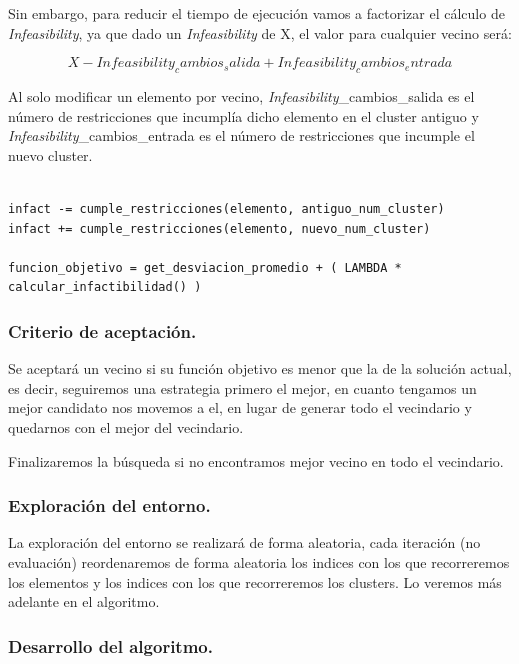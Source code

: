 \documentclass[12pt, spanish]{article}
\begin{document}
Sin embargo, para reducir el tiempo de ejecución vamos a factorizar el cálculo de \textit{Infeasibility}, ya que dado un \textit{Infeasibility} de X, el valor para cualquier vecino será:

$$X - \textit{Infeasibility}_cambios_salida + \textit{Infeasibility}_cambios_entrada$$
 
 Al solo modificar un elemento por vecino, \textit{Infeasibility}\_cambios\_salida  es el número de restricciones que incumplía dicho elemento en el cluster antiguo y \textit{Infeasibility}\_cambios\_entrada es el número de restricciones que incumple el nuevo cluster.
 
 
 
\begin{lstlisting}

infact -= cumple_restricciones(elemento, antiguo_num_cluster)
infact += cumple_restricciones(elemento, nuevo_num_cluster)

funcion_objetivo = get_desviacion_promedio + ( LAMBDA * calcular_infactibilidad() )

 \end{lstlisting}

\subsubsection{Criterio de aceptación.}

Se aceptará un vecino si su función objetivo es menor que la de la solución actual, es decir, seguiremos una estrategia primero el mejor, en cuanto tengamos un mejor candidato nos movemos a el, en lugar de generar todo el vecindario y quedarnos con el mejor del vecindario.

Finalizaremos la búsqueda si no encontramos mejor vecino en todo el vecindario.

\subsubsection{Exploración del entorno.}

La exploración del entorno se realizará de forma aleatoria, cada iteración (no evaluación) reordenaremos de forma aleatoria los indices con los que recorreremos los elementos y los indices con los que recorreremos los clusters. Lo veremos más adelante en el algoritmo.

\subsubsection{Desarrollo del algoritmo.}
\end{document}
